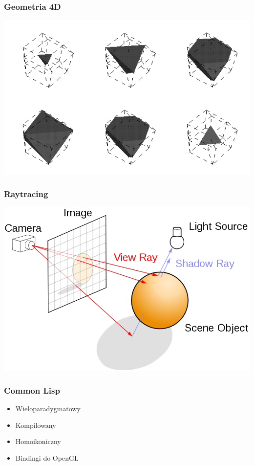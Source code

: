 \documentclass{beamer}
\begin{document}
\begin{frame}
\frametitle{Geometria 4D}

\includegraphics[scale=0.65]{hypercube-passing.png}

\end{frame}


\begin{frame}
\frametitle{Raytracing}

\includegraphics[scale=0.3]{raytracing.png}

\end{frame}



\begin{frame}
\frametitle{Common Lisp}

\begin{itemize}
\item Wieloparadygmatowy
\item Kompilowany
\item Homoikoniczny
\item Bindingi do OpenGL
\end{itemize}

\end{frame}
\end{document}
